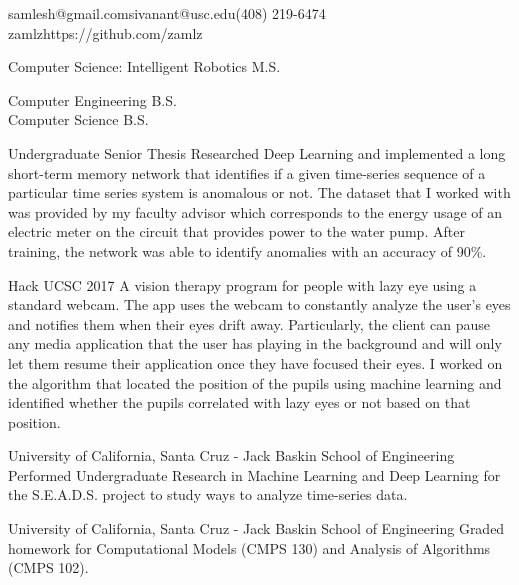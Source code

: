 \documentclass{resume}
\begin{document}
{samlesh@gmail.com}{sivanant@usc.edu}{(408) 219-6474}
{zamlz}{https://github.com/zamlz}


Computer Science: Intelligent Robotics M.S.

Computer Engineering B.S. \\ Computer Science B.S.


{Undergraduate Senior Thesis}
{Researched Deep Learning and implemented a long short-term memory
network that identifies if a given time-series sequence of a particular
time series system is anomalous or not. The dataset that I worked with
was provided by my faculty advisor which corresponds to the energy usage
of an electric meter on the circuit that provides power to the water
pump. After training, the network was able to identify anomalies with
an accuracy of 90\%.}

{Hack UCSC 2017}
{A vision therapy program for people with lazy eye using a standard 
webcam. The app uses the webcam to constantly analyze the user's eyes 
and notifies them when their eyes drift away. Particularly, the client
can pause any media application that the user has playing in the 
background and will only let them resume their application once they 
have focused their eyes. I worked on the algorithm that located the
position of the pupils using machine learning and identified whether
the pupils correlated with lazy eyes or not based on that position.}


{University of California, Santa Cruz - Jack Baskin School of Engineering}
{Performed Undergraduate Research in Machine Learning and Deep Learning 
for the S.E.A.D.S. project to study ways to analyze time-series data.}

{University of California, Santa Cruz - Jack Baskin School of Engineering}
{Graded homework for Computational Models (CMPS 130) and Analysis of 
Algorithms (CMPS 102).}

\end{document}
